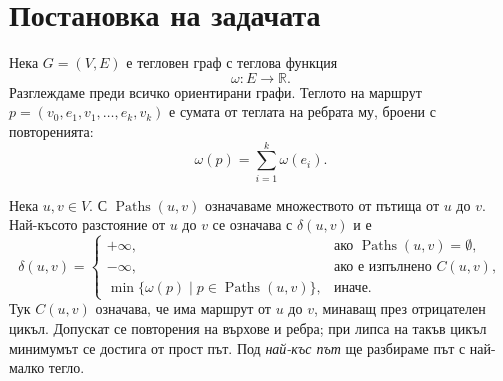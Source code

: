 \begin{konspekt}
\end{konspekt}

\section{Постановка на задачата}\label{s:8.1}

\begin{defn}
Нека $G=(V,E)$ е тегловен граф с теглова функция
\[
\omega:E\to\mathbb{R}.
\]
Разглеждаме преди всичко ориентирани графи. Теглото на маршрут $p=(v_0,e_1,v_1,\ldots,e_k,v_k)$ е сумата от теглата на ребрата му, броени с повторенията:
\[
\omega(p)=\sum_{i=1}^{k}\omega(e_i).
\]
\end{defn}

\begin{defn}
Нека $u,v\in V$. С $\operatorname{Paths}(u,v)$ означаваме множеството от пътища от $u$ до $v$. Най-късото разстояние от $u$ до $v$ се означава с $\delta(u,v)$ и е
\[
\delta(u,v)=
\begin{cases}
+\infty, & \text{ако }\operatorname{Paths}(u,v)=\emptyset,\\
-\infty, & \text{ако е изпълнено }C(u,v),\\
\min\{\omega(p)\mid p\in\operatorname{Paths}(u,v)\}, & \text{иначе}.
\end{cases}
\]
Тук $C(u,v)$ означава, че има маршрут от $u$ до $v$, минаващ през отрицателен цикъл. Допускат се повторения на върхове и ребра; при липса на такъв цикъл минимумът се достига от прост път. Под \emph{най-къс път} ще разбираме път с най-малко тегло.
\end{defn}

